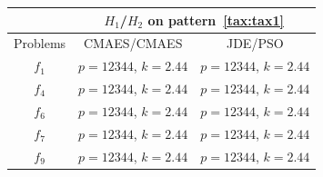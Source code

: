 \documentclass{sig-alternate}
\begin{document}
\begin{table}
    \begin{tabular}{c|c|c}
        & \multicolumn{2}{c}{$H_1$/$H_2$ on pattern~\ref{tax:tax1}} \\\hline
        Problems & CMAES/CMAES         & JDE/PSO \\\hline
        $f_1$    & $p=12344$, $k=2.44$ & $p=12344$, $k=2.44$ \\
        $f_4$    & $p=12344$, $k=2.44$ & $p=12344$, $k=2.44$ \\
        $f_6$    & $p=12344$, $k=2.44$ & $p=12344$, $k=2.44$ \\
        $f_7$    & $p=12344$, $k=2.44$ & $p=12344$, $k=2.44$ \\
        $f_9$    & $p=12344$, $k=2.44$ & $p=12344$, $k=2.44$ \\
    \end{tabular}
\end{table}
\end{document}
